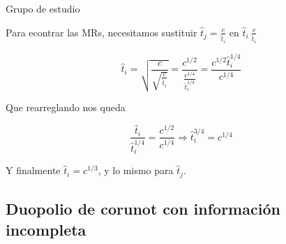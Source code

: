 \documentclass[12pt]{article}
\begin{document}
\begin{exbox}{Grupo de estudio}
\begin{center}
	\end{center}

	Para econtrar las MRs, necesitamos sustituir $ \hat{t}_j = \frac{c}{\hat{t}_i} $ en $ \hat{t}_i \ \frac{c}{\hat{t}_i} $

	$$
		\hat{t}_i = \sqrt{\frac{c}{\sqrt{\frac{c}{\hat{t}_i}}}} = \frac{c^{1/2}}{\frac{c^{1/4}}{\hat{t}_i^{1/4}}} = \frac{c^{1/2}\hat{t}_i^{1/4}}{c^{1/4}}
	$$

	Que rearreglando nos queda


	\[
		\frac{\hat{t}_i}{\hat{t}_i^{1/4}}=\frac{c^{1/2}}{c^{1/4}} \Longrightarrow \hat{t}_i^{3/4}=c^{1/4}
	\]

	Y finalmente $\hat{t}_i = c^{1/3}$, y lo mismo para $\hat{t}_j$.


\end{exbox}

\subsection{Duopolio de corunot con información incompleta}
\end{document}
